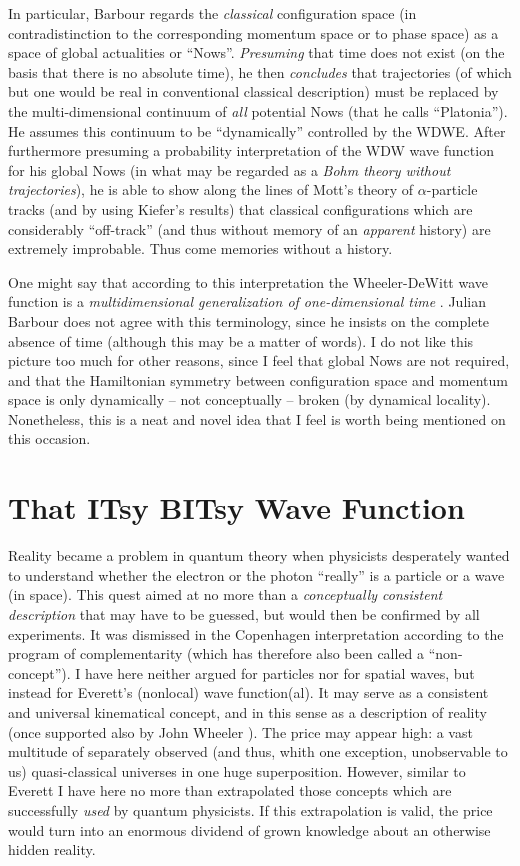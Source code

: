 In particular, Barbour regards the {\it classical} configuration space
(in contradistinction to the corresponding momentum space or to phase
space) as a space of global actualities or ``Nows''. {\it Presuming}
that time does not exist (on the basis that there is no absolute
time), he then {\it concludes} that trajectories (of which but one
would be real in conventional classical description) must be replaced
by the multi-dimensional continuum of {\it all} potential Nows (that
he calls ``Platonia''). He assumes this continuum to be
``dynamically'' controlled by the WDWE. After furthermore presuming a
probability interpretation of the WDW wave function for his global
Nows (in what may be regarded as a {\it Bohm theory without
trajectories}), he is able to show along the lines of Mott's
theory of
$\alpha$-particle tracks (and by using Kiefer's results) that classical
configurations which are considerably ``off-track'' (and thus without
memory of an {\it apparent} history) are extremely improbable. Thus
come memories without a history.

One might say
that according to this interpretation the Wheeler-DeWitt wave function
is a {\it multidimensional generalization of one-dimensional
time} \cite{TD}. Julian Barbour does not agree with this terminology,
since he insists on the complete absence of time (although this may be
a matter of words). I do not like this picture too much for other
reasons, since I feel that global Nows are not required, and that the
Hamiltonian symmetry between configuration space and momentum space is
only dynamically -- not conceptually -- broken (by dynamical
locality). Nonetheless, this is a neat and novel idea that I feel
is worth being mentioned on this occasion.

\section{That ITsy BITsy Wave Function}
Reality became a problem in quantum theory when physicists desperately
wanted to understand whether the electron or the photon ``really'' is
a particle or a wave (in space). This quest aimed at no more than a
{\it conceptually consistent description} that may have to be
guessed, but would then be confirmed by all experiments. It was
dismissed in the Copenhagen interpretation according to the program  of
complementarity (which has therefore also been called a
``non-concept'').  I have here neither argued for particles nor for
spatial waves, but instead for Everett's (nonlocal) wave function(al).
It may serve as a consistent and universal kinematical concept, and in
this sense as a description of reality  (once supported also by John
Wheeler
\cite{WhRevModPhys}).  The price may appear high: a vast multitude of
separately observed (and thus, whith one exception, unobservable to us)
quasi-classical universes in one huge superposition. However, similar
to Everett I have here no more than extrapolated those concepts which
are successfully {\it used} by quantum physicists. If this
extrapolation is valid, the price would turn into an enormous dividend
of grown knowledge about an otherwise hidden reality.

